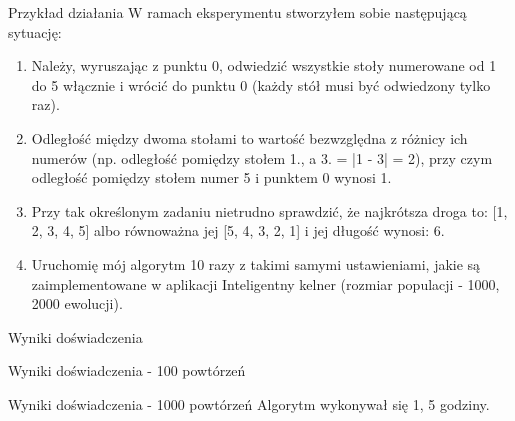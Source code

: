 \documentclass[a4paper,10pt]{beamer}
\begin{document}
			\begin{frame}{Przykład działania}
				W ramach eksperymentu stworzyłem sobie następującą sytuację:
				\begin{enumerate}
					\item Należy, wyruszając z punktu 0, odwiedzić wszystkie stoły numerowane od 1 do 5 włącznie i wrócić do punktu 0 (każdy stół musi być odwiedzony tylko raz). 
					\item Odległość między dwoma stołami to wartość bezwzględna z różnicy ich numerów (np. odległość pomiędzy stołem 1., a 3. = |1 - 3| = 2), przy czym odległość pomiędzy stołem numer 5 i punktem 0 wynosi 1.
					\item Przy tak określonym zadaniu nietrudno sprawdzić, że najkrótsza droga to: [1, 2, 3, 4, 5] albo równoważna jej [5, 4, 3, 2, 1] i jej długość wynosi: 6.
					\item Uruchomię mój algorytm 10 razy z takimi samymi ustawieniami, jakie są zaimplementowane w aplikacji Inteligentny kelner (rozmiar populacji - 1000, 2000 ewolucji).
				\end{enumerate}
			\end{frame}
		\begin{frame}{Wyniki doświadczenia}
		\end{frame}
		\begin{frame}{Wyniki doświadczenia - 100 powtórzeń}
		\end{frame}
		\begin{frame}{Wyniki doświadczenia - 1000 powtórzeń}
			Algorytm wykonywał się 1, 5 godziny.
		\end{frame}
\end{document}
